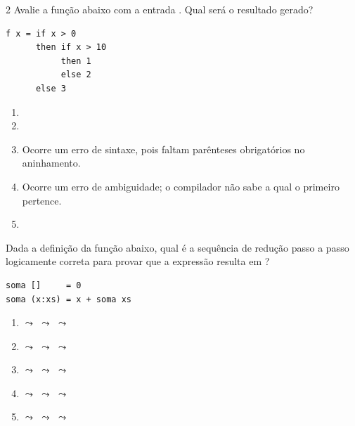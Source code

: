 \documentclass[a4paper,10pt,brazil]{article}
\begin{document}
\begin{multicols}{2}
Avalie a função abaixo com a entrada . Qual será o resultado gerado?
\begin{verbatim}
f x = if x > 0
      then if x > 10
           then 1
           else 2
      else 3
\end{verbatim}

\begin{enumerate}
  \item {}

  \item {}

  \item Ocorre um erro de sintaxe, pois faltam parênteses obrigatórios no aninhamento.

  \item Ocorre um erro de ambiguidade; o compilador não sabe a qual  o primeiro  pertence.

  \item {}


\end{enumerate}

Dada a definição da função  abaixo, qual é a sequência de redução passo a passo logicamente correta para provar que a expressão  resulta em ?

\begin{verbatim}
soma []     = 0
soma (x:xs) = x + soma xs
\end{verbatim}

\begin{enumerate}
  \item {} $\leadsto$  $\leadsto$  $\leadsto$ 

  \item {} $\leadsto$  $\leadsto$  $\leadsto$ 

  \item {} $\leadsto$  $\leadsto$  $\leadsto$ 

  \item {} $\leadsto$  $\leadsto$  $\leadsto$ 

  \item {} $\leadsto$  $\leadsto$  $\leadsto$ 



\end{enumerate}
\end{multicols}
\end{document}
